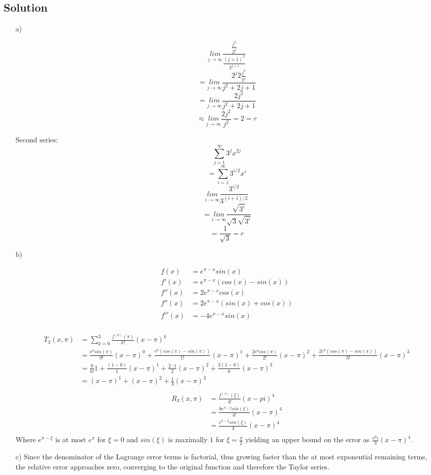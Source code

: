 \documentclass[10pt]{article}
\numberwithin{equation}{section}
\newcommand{\epix}{e^{\pi-x}}
\begin{document}
\subsection*{Solution}
\begin{enumerate}
  \item[a)]{
       $$\underset{j\rightarrow \infty}{lim} \frac{\frac{j^2}{2^j}}{\frac{(j+1)^2}{2^{j+1}}}$$
       $$=\underset{j\rightarrow \infty}{lim} \frac{2^j 2 \frac{j^2}{2^j}}{j^2 + 2j + 1}$$
       $$=\underset{j\rightarrow \infty}{lim} \frac{2 j^2}{j^2 + 2j + 1}$$
       $$\approx \underset{j\rightarrow \infty}{lim} \frac{2 j^2}{j^2} = 2 = r$$

       Second series:
       $$\sum_{j=1}^{\infty} 3^j x^{2j}$$
       $$=\sum_{i=1}^{\infty} 3^{i/2} x^i$$
       $$\underset{i\rightarrow \infty}{lim} \frac{3^{i/2}}{3^{(i+1)/2}}$$
       $$=\underset{i\rightarrow \infty}{lim} \frac{\sqrt{3^i}}{\sqrt{3}\sqrt{3^i}}$$
       $$=\frac{1}{\sqrt{3}} = r$$
    }
  \item[b)]{
    \begin{align*}
      f(x) &= \epix sin(x)\\
      f'(x) &= \epix (cos(x) - sin(x))\\
      f''(x) &= 2\epix cos(x)\\
      f''(x) &= 2\epix (sin(x) + cos(x))\\
      f^{iv}(x) &= -4\epix sin(x)\\
    \end{align*}

    \begin{align*}
      T_3(x,\pi) &= \sum_{k=0}^3 \frac{f^{(k)}(\pi)}{k!}(x-\pi)^k\\
                 &= \frac{e^0 sin(\pi)}{0!}(x-\pi)^0 + \frac{e^0 (cos(\pi) - sin(\pi))}{1!}(x-\pi)^1 + \frac{2e^0 cos(\pi)}{2!}(x-\pi)^2 + \frac{2e^0 (cos(\pi) - sin(\pi))}{3!}(x-\pi)^3\\
                 &= \frac{0}{0!}1 + \frac{ (1 - 0)}{1}(x-\pi)^1 + \frac{2\cdot 1}{2}(x-\pi)^2 + \frac{2 (1 - 0)}{6}(x-\pi)^3\\
                 &= (x-\pi)^1 + (x-\pi)^2 + \frac{1}{3}(x-\pi)^3\\
    \end{align*}
    \begin{align*}
      R_3(x,\pi) &= \frac{f^{(4)}(\xi)}{4!}(x-pi)^4\\
                 &= \frac{8e^{\pi-\xi}sin(\xi)}{4!}(x-\pi)^4\\
                 &= \frac{e^{\pi-\xi}sin(\xi)}{3}(x-\pi)^4\\
    \end{align*}
    Where $e^{\pi-\xi}$ is at most $e^\pi$ for $\xi = 0$ and $sin(\xi)$ is maximally $1$ for $\xi = \frac{\pi}{2}$ yielding an upper bound on the error as $\frac{e^pi}{3}(x-\pi)^4$.

    }
  \item[c)]{
      Since the denominator of the Lagrange error terms is factorial, thus growing faster than the at most exponential remaining terms, the relative error approaches zero, converging to the original function and therefore the Taylor series.
    }
\end{enumerate}
\end{document}
